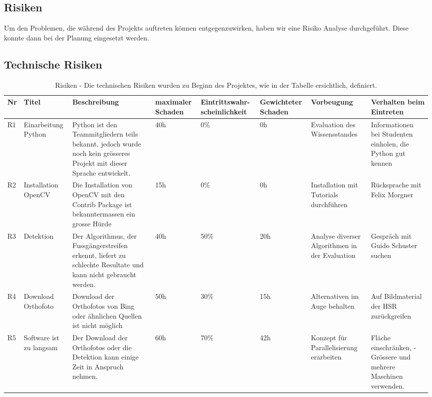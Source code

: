\begin{landscape}
\section{Risiken}
Um den Problemen, die während des Projekts auftreten können entgegenzuwirken, haben wir eine Risiko Analyse durchgeführt. Diese konnte dann bei der Planung eingesetzt werden.

\subsection{Technische Risiken}
\begin{table}[H]
    \begin{tabular}{|p{0.4cm}|p{1.8cm}|p{7cm}|p{1.5cm}|p{2.25cm}|p{1.75cm}|p{3cm}|p{4cm}|}
    \hline    
    \rowcolor{lightblue}
    Nr & Titel & Beschreibung & maximaler Schaden & Eintrittswahr-scheinlichkeit & Gewichteter Schaden & Vorbeugung & Verhalten beim Eintreten \\ \hline
	R1 & Einarbeitung Python & Python ist den Teammitgliedern teils bekannt, jedoch wurde noch kein grösseres Projekt mit dieser Sprache entwickelt. & 40h & 0\% &0h & Evaluation des Wissensstandes & Informationen bei Studenten einholen, die Python gut kennen \\ \hline
	R2 & Installation OpenCV & Die Installation von OpenCV mit den Contrib Package ist bekanntermassen ein grosse Hürde & 15h & 0\% & 0h & Installation mit Tutorials durchführen & Rücksprache mit Felix Morgner \\ \hline
	R3 & Detektion & Der Algorithmus, der Fussgängerstreifen erkennt, liefert zu schlechte Resultate und kann nicht gebraucht werden. & 40h & 50\% & 20h & Analyse diverser Algorithmen in der Evaluation & Gespräch mit Guido Schuster suchen \\ \hline
	R4 & Download Orthofoto & Download der Orthofotos von Bing oder ähnlichen Quellen ist nicht möglich & 50h & 30\% & 15h & Alternativen im Auge behalten & Auf Bildmaterial der HSR zurückgreifen \\ \hline
	R5 & Software ist zu langsam & Der Download der Orthofotos oder die Detektion kann einige Zeit in Anspruch nehmen.	& 60h & 70\% & 42h & Konzept für Parallelisierung erarbeiten & Fläche einschränken, - Grössere und mehrere Maschinen verwenden. \\ \hline
    \end{tabular}
    \caption[Risiken]{Risiken - Die technischen Risiken wurden zu Beginn des Projektes, wie in der Tabelle ersichtlich, definiert.}
\end{table}
\end{landscape}

